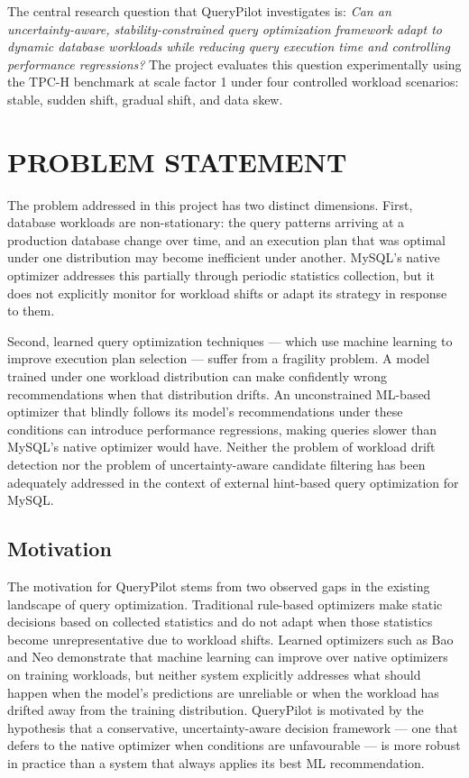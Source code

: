 The central research question that QueryPilot investigates is: \textit{Can an
uncertainty-aware, stability-constrained query optimization framework adapt to
dynamic database workloads while reducing query execution time and controlling
performance regressions?} The project evaluates this question experimentally
using the TPC-H benchmark at scale factor 1 under four controlled workload
scenarios: stable, sudden shift, gradual shift, and data skew.

\section{PROBLEM STATEMENT}
\label{sec:problem_statement}

The problem addressed in this project has two distinct dimensions. First,
database workloads are non-stationary: the query patterns arriving at a
production database change over time, and an execution plan that was optimal
under one distribution may become inefficient under another. MySQL's native
optimizer addresses this partially through periodic statistics collection, but
it does not explicitly monitor for workload shifts or adapt its strategy in
response to them.

Second, learned query optimization techniques --- which use machine learning to
improve execution plan selection --- suffer from a fragility problem. A model
trained under one workload distribution can make confidently wrong
recommendations when that distribution drifts. An unconstrained ML-based
optimizer that blindly follows its model's recommendations under these
conditions can introduce performance regressions, making queries slower than
MySQL's native optimizer would have. Neither the problem of workload drift
detection nor the problem of uncertainty-aware candidate filtering has been
adequately addressed in the context of external hint-based query optimization
for MySQL.

\subsection{Motivation}
\label{subsec:motivation}

The motivation for QueryPilot stems from two observed gaps in the existing
landscape of query optimization. Traditional rule-based optimizers make static
decisions based on collected statistics and do not adapt when those statistics
become unrepresentative due to workload shifts. Learned optimizers such as Bao
\cite{marcus2021bao} and Neo \cite{marcus2019neo} demonstrate that machine
learning can improve over native optimizers on training workloads, but neither
system explicitly addresses what should happen when the model's predictions are
unreliable or when the workload has drifted away from the training distribution.
QueryPilot is motivated by the hypothesis that a conservative,
uncertainty-aware decision framework --- one that defers to the native optimizer
when conditions are unfavourable --- is more robust in practice than a system
that always applies its best ML recommendation.


